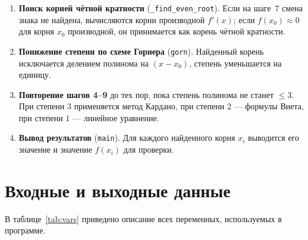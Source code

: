 \documentclass[a4paper,14pt]{extarticle}
\begin{document}
\begin{enumerate}
  \item \textbf{Поиск корней чётной кратности} (\texttt{\_find\_even\_root}). Если на шаге~7 смена знака не найдена, вычисляются корни производной $f'(x)$; если $f(x_0) \approx 0$ для корня $x_0$ производной, он принимается как корень чётной кратности.

  \item \textbf{Понижение степени по схеме Горнера} (\texttt{gorn}). Найденный корень исключается делением полинома на $(x - x_0)$, степень уменьшается на единицу.

  \item \textbf{Повторение шагов 4--9} до тех пор, пока степень полинома не станет $\leq 3$. При степени $3$ применяется метод Кардано, при степени $2$ --- формулы Виета, при степени $1$ --- линейное уравнение.

  \item \textbf{Вывод результатов} (\texttt{main}). Для каждого найденного корня $x_i$ выводится его значение и значение $f(x_i)$ для проверки.
\end{enumerate}

\newpage
\section*{Входные и выходные данные}
\label{sec:variables}

В таблице~\ref{tab:vars} приведено описание всех переменных, используемых в программе.
\end{document}
